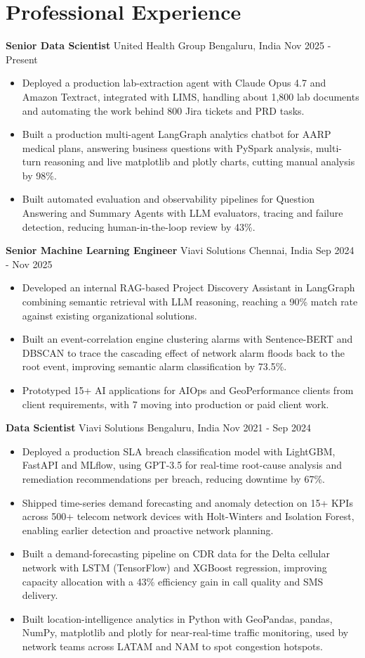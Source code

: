 \documentclass[10pt,a4paper]{article}
\newcommand{\role}[4]{\textbf{#1} \textbar{} #2 \hfill #3 \textbar{} #4\par}
\begin{document}
\section{Professional Experience}
\role{Senior Data Scientist}{United Health Group}{Bengaluru, India}{Nov 2025 - Present}
\begin{itemize}
  \item Deployed a production lab-extraction agent with Claude Opus 4.7 and Amazon Textract, integrated with LIMS, handling about 1,800 lab documents and automating the work behind 800 Jira tickets and PRD tasks.
  \item Built a production multi-agent LangGraph analytics chatbot for AARP medical plans, answering business questions with PySpark analysis, multi-turn reasoning and live matplotlib and plotly charts, cutting manual analysis by 98\%.
  \item Built automated evaluation and observability pipelines for Question Answering and Summary Agents with LLM evaluators, tracing and failure detection, reducing human-in-the-loop review by 43\%.
\end{itemize}
\vspace{3pt}
\role{Senior Machine Learning Engineer}{Viavi Solutions}{Chennai, India}{Sep 2024 - Nov 2025}
\begin{itemize}
  \item Developed an internal RAG-based Project Discovery Assistant in LangGraph combining semantic retrieval with LLM reasoning, reaching a 90\% match rate against existing organizational solutions.
  \item Built an event-correlation engine clustering alarms with Sentence-BERT and DBSCAN to trace the cascading effect of network alarm floods back to the root event, improving semantic alarm classification by 73.5\%.
  \item Prototyped 15+ AI applications for AIOps and GeoPerformance clients from client requirements, with 7 moving into production or paid client work.
\end{itemize}
\vspace{3pt}
\role{Data Scientist}{Viavi Solutions}{Bengaluru, India}{Nov 2021 - Sep 2024}
\begin{itemize}
  \item Deployed a production SLA breach classification model with LightGBM, FastAPI and MLflow, using GPT-3.5 for real-time root-cause analysis and remediation recommendations per breach, reducing downtime by 67\%.
  \item Shipped time-series demand forecasting and anomaly detection on 15+ KPIs across 500+ telecom network devices with Holt-Winters and Isolation Forest, enabling earlier detection and proactive network planning.
  \item Built a demand-forecasting pipeline on CDR data for the Delta cellular network with LSTM (TensorFlow) and XGBoost regression, improving capacity allocation with a 43\% efficiency gain in call quality and SMS delivery.
  \item Built location-intelligence analytics in Python with GeoPandas, pandas, NumPy, matplotlib and plotly for near-real-time traffic monitoring, used by network teams across LATAM and NAM to spot congestion hotspots.
\end{itemize}
\end{document}
